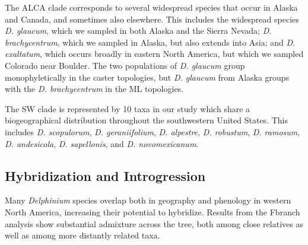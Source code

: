 \documentclass[11pt]{article}
\begin{document}
The ALCA clade corresponds to several widespread species that occur in Alaska
and Canada, and sometimes also elsewhere. This includes the widespread species
\emph{D. glaucum}, which we sampled in both Alaska and the Sierra Nevada; 
\emph{D. brachycentrum}, which we sampled in Alaska, but also extends into Asia;
and \emph{D. exaltatum}, which occurs broadly in eastern North America, but which 
we sampled Colorado near Boulder. The two populations of \emph{D. glaucum} group
monophyletically in the caster topologies, but \emph{D. glaucum} from Alaska groups 
with the \emph{D. brachycentrum} in the ML topologies.

The SW clade is represented by 10 taxa in our study which share a biogeographical
distribution throughout the southwestern United States. This includes 
\emph{D. scopulorum}, \emph{D. geraniifolium}, \emph{D. alpestre},
\emph{D. robustum}, \emph{D. ramosum}, \emph{D. andesicola}, \emph{D. sapellonis},
and \emph{D. novomexicanum}. 


\subsection{Hybridization and Introgression}
Many \emph{Delphinium} species overlap both in geography and phenology in western 
North America, increasing their potential to hybridize. Results from the Fbranch
analysis show substantial admixture across the tree, both among close relatives as
well as among more distantly related taxa.
% 


\end{document}
